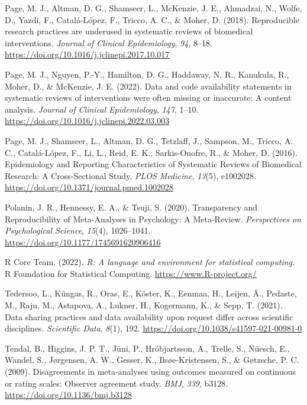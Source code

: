 \documentclass[
  ,apa7,floatsintext]{apa6}
\newlength{\cslhangindent}
\newlength{\cslentryspacingunit} %
\newenvironment{CSLReferences}[2] %
 {%
  \setlength{\parindent}{0pt}
  \ifodd #1
  \let\oldpar\par
  \def\par{\hangindent=\cslhangindent\oldpar}
  \fi
  \setlength{\parskip}{#2\cslentryspacingunit}
 }%
 {}
\begin{document}
\begin{CSLReferences}{1}{0}
\leavevmode{}%
Page, M. J., Altman, D. G., Shamseer, L., McKenzie, J. E., Ahmadzai, N., Wolfe, D., Yazdi, F., Catalá-López, F., Tricco, A. C., \& Moher, D. (2018). Reproducible research practices are underused in systematic reviews of biomedical interventions. \emph{Journal of Clinical Epidemiology}, \emph{94}, 8--18. \url{https://doi.org/10.1016/j.jclinepi.2017.10.017}

\leavevmode{}%
Page, M. J., Nguyen, P.-Y., Hamilton, D. G., Haddaway, N. R., Kanukula, R., Moher, D., \& McKenzie, J. E. (2022). Data and code availability statements in systematic reviews of interventions were often missing or inaccurate: A content analysis. \emph{Journal of Clinical Epidemiology}, \emph{147}, 1--10. \url{https://doi.org/10.1016/j.jclinepi.2022.03.003}

\leavevmode{}%
Page, M. J., Shamseer, L., Altman, D. G., Tetzlaff, J., Sampson, M., Tricco, A. C., Catalá-López, F., Li, L., Reid, E. K., Sarkis-Onofre, R., \& Moher, D. (2016). Epidemiology and {Reporting} {Characteristics} of {Systematic} {Reviews} of {Biomedical} {Research}: {A} {Cross}-{Sectional} {Study}. \emph{PLOS Medicine}, \emph{13}(5), e1002028. \url{https://doi.org/10.1371/journal.pmed.1002028}

\leavevmode{}%
Polanin, J. R., Hennessy, E. A., \& Tsuji, S. (2020). Transparency and {Reproducibility} of {Meta-Analyses} in {Psychology}: {A Meta-Review}. \emph{Perspectives on Psychological Science}, \emph{15}(4), 1026--1041. \url{https://doi.org/10.1177/1745691620906416}

\leavevmode{}%
R Core Team. (2022). \emph{R: A language and environment for statistical computing}. R Foundation for Statistical Computing. \url{https://www.R-project.org/}

\leavevmode{}%
Tedersoo, L., Küngas, R., Oras, E., Köster, K., Eenmaa, H., Leijen, Ä., Pedaste, M., Raju, M., Astapova, A., Lukner, H., Kogermann, K., \& Sepp, T. (2021). Data sharing practices and data availability upon request differ across scientific disciplines. \emph{Scientific Data}, \emph{8}(1), 192. \url{https://doi.org/10.1038/s41597-021-00981-0}

\leavevmode{}%
Tendal, B., Higgins, J. P. T., Jüni, P., Hróbjartsson, A., Trelle, S., Nüesch, E., Wandel, S., Jørgensen, A. W., Gesser, K., Ilsøe-Kristensen, S., \& Gøtzsche, P. C. (2009). Disagreements in meta-analyses using outcomes measured on continuous or rating scales: Observer agreement study. \emph{BMJ}, \emph{339}, b3128. \url{https://doi.org/10.1136/bmj.b3128}


\end{CSLReferences}
\end{document}
